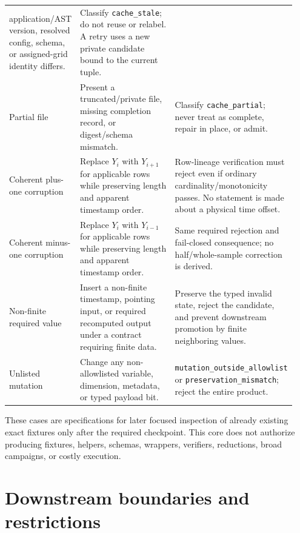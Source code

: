 \documentclass[11pt]{article}
\newcommand{\code}[1]{\texttt{#1}}
\begin{document}
\begin{longtable}{@{}L{0.20\linewidth}L{0.34\linewidth}L{0.40\linewidth}@{}}
application/AST version, resolved config, schema, or assigned-grid identity
differs. & Classify \code{cache\_stale}; do not reuse or relabel.  A retry uses
a new private candidate bound to the current tuple. \\
Partial file & Present a truncated/private file, missing completion record, or
digest/schema mismatch. & Classify \code{cache\_partial}; never treat as
complete, repair in place, or admit. \\
Coherent plus-one corruption & Replace $Y_i$ with $Y_{i+1}$ for applicable
rows while preserving length and apparent timestamp order. & Row-lineage
verification must reject even if ordinary cardinality/monotonicity passes.
No statement is made about a physical time offset. \\
Coherent minus-one corruption & Replace $Y_i$ with $Y_{i-1}$ for applicable
rows while preserving length and apparent timestamp order. & Same required
rejection and fail-closed consequence; no half/whole-sample correction is
derived. \\
Non-finite required value & Insert a non-finite timestamp, pointing input, or
required recomputed output under a contract requiring finite data. & Preserve
the typed invalid state, reject the candidate, and prevent downstream
promotion by finite neighboring values. \\
Unlisted mutation & Change any non-allowlisted variable, dimension, metadata,
or typed payload bit. & \code{mutation\_outside\_allowlist} or
\code{preservation\_mismatch}; reject the entire product. \\
\bottomrule
\end{longtable}

These cases are specifications for later focused inspection of already
existing exact fixtures only after the required checkpoint.  This core does
not authorize producing fixtures, helpers, schemas, wrappers, verifiers,
reductions, broad campaigns, or costly execution.

\section{Downstream boundaries and restrictions}
\end{document}
